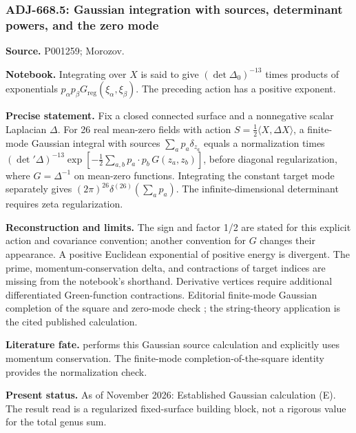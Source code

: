 \subsubsection{ADJ-668.5: Gaussian integration with sources, determinant powers, and the zero mode}
\noindent\textbf{Source.} P001259; Morozov.\par
\noindent\textbf{Notebook.} Integrating over \(X\) is said to give \((\det\Delta_0)^{-13}\) times products of exponentials \(p_\alpha p_\beta G_{\mathrm{reg}}(\xi_\alpha,\xi_\beta)\). The preceding action has a positive exponent.\par

\noindent\textbf{Precise statement.} Fix a closed connected surface and a nonnegative scalar Laplacian \(\Delta\). For 26 real mean-zero fields with action \(S=\frac12\langle X,\Delta X\rangle\), a finite-mode Gaussian integral with sources \(\sum_a p_a\delta_{z_a}\) equals a normalization times \((\det{}'\Delta)^{-13}\exp[-\frac12\sum_{a,b}p_a\cdot p_b\,G(z_a,z_b)]\), before diagonal regularization, where \(G=\Delta^{-1}\) on mean-zero functions. Integrating the constant target mode separately gives \((2\pi)^{26}\delta^{(26)}(\sum_a p_a)\). The infinite-dimensional determinant requires zeta regularization.\par

\noindent\textbf{Reconstruction and limits.} The sign and factor 1/2 are stated for this explicit action and covariance convention; another convention for \(G\) changes their appearance. A positive Euclidean exponential of positive energy is divergent. The prime, momentum-conservation delta, and contractions of target indices are missing from the notebook's shorthand. Derivative vertices require additional differentiated Green-function contractions. Editorial finite-mode Gaussian completion of the square and zero-mode check \oursComputed; the string-theory application is the cited published calculation.\par

\noindent\textbf{Literature fate.} \citet[\S6, (6.21)--(6.24)]{belavinknizhnik1986complex} performs this Gaussian source calculation and explicitly uses momentum conservation. The finite-mode completion-of-the-square identity provides the normalization check.\par

\noindent\textbf{Present status.} As of November 2026: Established Gaussian calculation (E). The result read is a regularized fixed-surface building block, not a rigorous value for the total genus sum.\par

